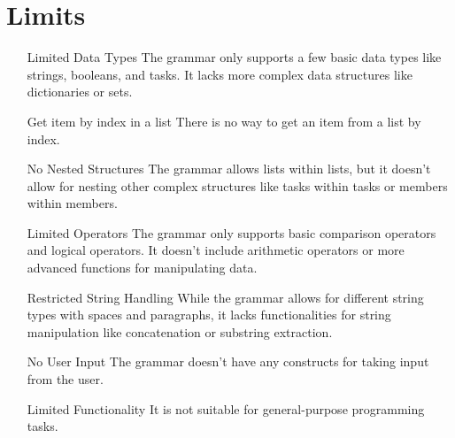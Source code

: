 \section{Limits}
\label{sec:limits}

\begin{enumerate}
	\item [Limited Data Types] The grammar only supports a few basic data types like strings, booleans, and tasks. It lacks more complex data structures like dictionaries or sets.
	\item [Get item by index in a list] There is no way to get an item from a list by index.
	\item [No Nested Structures] The grammar allows lists within lists, but it doesn't allow for nesting other complex structures like tasks within tasks or members within members.
	\item [Limited Operators] The grammar only supports basic comparison operators and logical operators. It doesn't include arithmetic operators or more advanced functions for manipulating data.
	\item [Restricted String Handling] While the grammar allows for different string types with spaces and paragraphs, it lacks functionalities for string manipulation like concatenation or substring extraction.
	\item [No User Input] The grammar doesn't have any constructs for taking input from the user.
	\item [Limited Functionality] It is not suitable for general-purpose programming tasks.
\end{enumerate}

